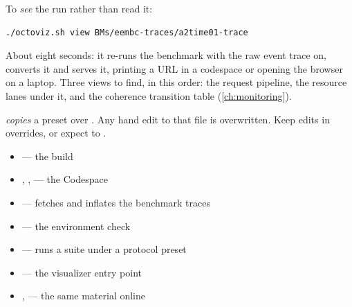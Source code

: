 To \emph{see} the run rather than read it:

\begin{lstlisting}[style=shell]
./octoviz.sh view BMs/eembc-traces/a2time01-trace
\end{lstlisting}

About eight seconds: it re-runs the benchmark with the raw event trace on, converts it and
serves it, printing a URL in a codespace or opening the browser on a laptop. Three views to
find, in this order: the request pipeline, the resource lanes under it, and the coherence
transition table (\cref{ch:monitoring}).

\begin{trapbox}
 \emph{copies} a preset over
. Any hand edit to that file is overwritten. Keep edits in 
overrides, or expect to .
\end{trapbox}

\begin{wherebox}
\begin{itemize}[nosep,leftmargin=1.2em]
\item {} --- the build
\item {}, ,  --- the Codespace
\item {} --- fetches and inflates the benchmark traces
\item {} --- the environment check
\item {} --- runs a suite under a protocol preset
\item {} --- the visualizer entry point
\item {},  --- the same material online
\end{itemize}
\end{wherebox}
